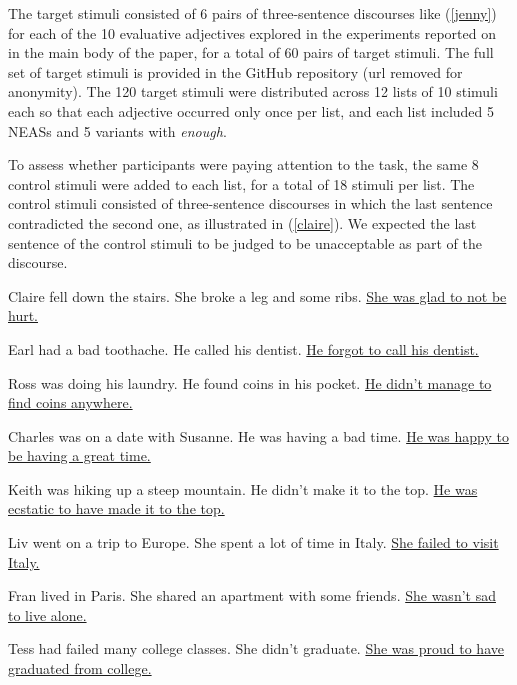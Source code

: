 \documentclass[11pt,fleqn]{article}
\newcommand{\6}{\mbox{$[\hspace*{-.6mm}[$}}
\newcommand{\9}{\mbox{$]\hspace*{-.6mm}]$}}
\begin{document}
The target stimuli consisted of 6 pairs of three-sentence discourses like (\ref{jenny}) for each of the 10 evaluative adjectives explored in the experiments reported on in the main body of the paper, for a total of 60 pairs of target stimuli. The full set of target stimuli is provided in the GitHub repository (url removed for anonymity). The 120 target stimuli were distributed across 12 lists of 10 stimuli each so that each adjective occurred only once per list, and each list included 5 NEASs and 5 variants with {\em enough}. 

To assess whether participants were paying attention to the task, the same 8 control stimuli were added to each list, for a total of 18 stimuli per list. The control stimuli consisted of three-sentence discourses in
which the last sentence contradicted the second one, as illustrated in
(\ref{claire}). We expected the last sentence of the control stimuli to be judged to be unacceptable as part of the discourse.

\begin{exe} 
\ex\label{claire} 
\begin{xlist}
\ex Claire fell down the stairs. She broke a leg and some ribs. \uline{She was glad to not be hurt.} 

\ex Earl had a bad toothache. He called his dentist. \uline{He forgot to call his dentist.}

\ex Ross was doing his laundry. He found coins in his pocket. \uline{He didn't manage to find coins anywhere.}

\ex Charles was on a date with Susanne. He was having a bad time. \uline{He was happy to be having a great time.}

\ex Keith was hiking up a steep mountain. He didn't make it to the top. \uline{He was ecstatic to have made it to the top.}

\ex Liv went on a trip to Europe. She spent a lot of time in Italy. \uline{She failed to visit Italy.}

\ex Fran lived in Paris. She shared an apartment with some friends. \uline{She wasn't sad to live alone.}

\ex Tess had failed many college classes. She didn't graduate. \uline{She was proud to have graduated from college.}

\end{xlist}
\end{exe}
\end{document}
